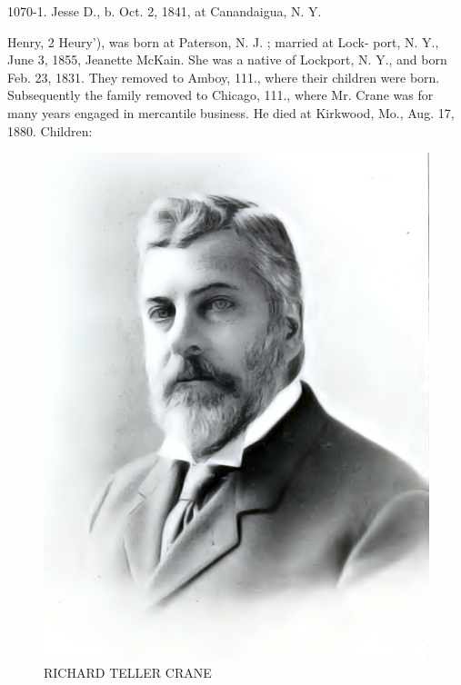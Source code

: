 \documentclass[oneside]{book}
\begin{document}
1070-1. Jesse D., b. Oct. 2, 1841, at Canandaigua, N. Y. 

Henry, 2 Heury'), was born at Paterson, N. J. ; married at Lock- 
port, N. Y., June 3, 1855, Jeanette McKain. She was a native 
of Lockport, N. Y., and born Feb. 23, 1831. They removed 
to Amboy, 111., where their children were born. Subsequently the 
family removed to Chicago, 111., where Mr. Crane was for many 
years engaged in mercantile business. He died at Kirkwood, 
Mo., Aug. 17, 1880. Children: 

\begin{figure}[htp]
	\centering
	\includegraphics[scale=0.8]{../white/richardTellerCraneWhite.png}
	\caption {RICHARD TELLER CRANE}
\end{figure}
\end{document}
